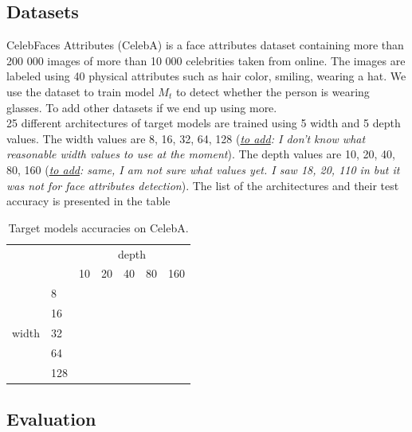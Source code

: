 \documentclass[11pt]{article}
\begin{document}
\subsection{Datasets}

CelebFaces Attributes (CelebA) \cite{liu2015faceattributes} is a face attributes dataset containing more than 200 000 images of more than 10 000 celebrities taken from online. The images are labeled using 40 physical attributes such as hair color, smiling, wearing a hat. We use the dataset to train model $M_t$ to detect whether the person is wearing glasses.
To add other datasets if we end up using more.\\
25 different architectures of target models are trained using 5 width and 5 depth values. The width values are 8, 16, 32, 64, 128 (\textit{\underline{to add}: I don’t know what reasonable width values to use at the moment}). The depth values are 10, 20, 40, 80, 160 (\textit{\underline{to add}: same, I am not sure what values yet. I saw 18, 20, 110 in \cite{Li2020} but it was not for face attributes detection}). The list of the architectures and their test accuracy is presented in the table 


\begin{table}[]
\centering
\begin{tabular}{cl|l|l|l|l|l|}
\cline{3-7}
\multicolumn{1}{l}{}                         &     & \multicolumn{5}{c|}{depth} \\ \cline{3-7} 
\multicolumn{1}{l}{}                         &     & 10  & 20  & 40  & 80 & 160 \\ \hline
\multicolumn{1}{|c|}{\multirow{5}{*}{width}} & 8   &     &     &     &    &     \\ \cline{2-7} 
\multicolumn{1}{|c|}{}                       & 16  &     &     &     &    &     \\ \cline{2-7} 
\multicolumn{1}{|c|}{}                       & 32  &     &     &     &    &     \\ \cline{2-7} 
\multicolumn{1}{|c|}{}                       & 64  &     &     &     &    &     \\ \cline{2-7} 
\multicolumn{1}{|c|}{}                       & 128 &     &     &     &    &     \\ \hline
\end{tabular}
\caption{Target models accuracies on CelebA.}
\label{pia_diagram}
\end{table}
\subsection{Evaluation}
\end{document}

